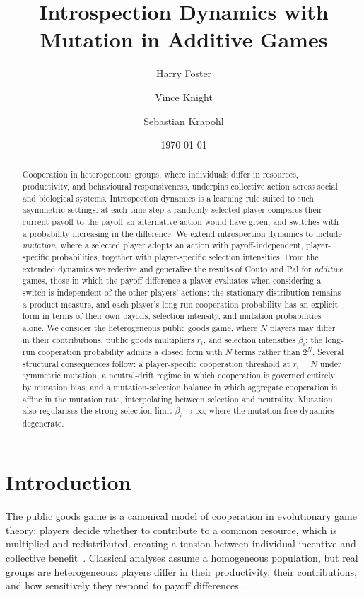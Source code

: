 \documentclass[11pt]{article}
\title{Introspection Dynamics with Mutation in Additive Games}
\author[1]{Harry Foster}
\author[1,*]{Vince Knight}
\author[2]{Sebastian Krapohl}
\affil[1]{School of Mathematics, Cardiff University}
\affil[2]{Faculty of Social and Behavioural Sciences, University of Amsterdam}
\affil[*]{Corresponding author: \texttt{knightva@cardiff.ac.uk}}
\date{\today}
\begin{document}
\maketitle

\begin{abstract}
Cooperation in heterogeneous groups, where individuals differ in resources,
productivity, and behavioural responsiveness, underpins collective action
across social and biological systems. Introspection dynamics is a learning
rule suited to such asymmetric settings: at each time step a randomly
selected player compares their current payoff to the payoff an alternative
action would have given, and switches with a probability increasing in the
difference. We extend introspection dynamics to include \emph{mutation},
where a selected player adopts an action with payoff-independent,
player-specific probabilities, together with player-specific selection
intensities. From the extended dynamics we rederive and generalise the
results of Couto and Pal for \emph{additive} games, those in which the
payoff difference a player evaluates when considering a switch is
independent of the other players' actions: the stationary distribution
remains a product measure, and each player's long-run cooperation
probability has an explicit form in terms of their own payoffs, selection
intensity, and mutation probabilities
alone. We consider the heterogeneous public goods game, where \(N\)
players may differ in their contributions, public goods multipliers \(r_i\),
and selection intensities \(\beta_i\); the long-run cooperation probability
admits a closed form with \(N\) terms rather than \(2^N\).
Several structural consequences follow: a player-specific cooperation threshold at
\(r_i = N\) under symmetric mutation, a neutral-drift regime in which cooperation is
governed entirely by mutation bias, and a mutation-selection balance in which aggregate
cooperation is affine in the mutation rate, interpolating between selection and
neutrality. Mutation also regularises the strong-selection limit
\(\beta_i\to\infty\), where the mutation-free dynamics degenerate.
\end{abstract}

\section{Introduction}

The public goods game is a canonical model of cooperation in evolutionary game theory:
players decide whether to contribute to a common resource, which is multiplied and
redistributed, creating a tension between individual incentive and collective
benefit~\cite{nowak2006five}. Classical analyses assume a homogeneous population, but
real groups are heterogeneous: players differ in their productivity, their
contributions,
and how sensitively they respond to payoff differences~\cite{hauser2019social}.
\end{document}
